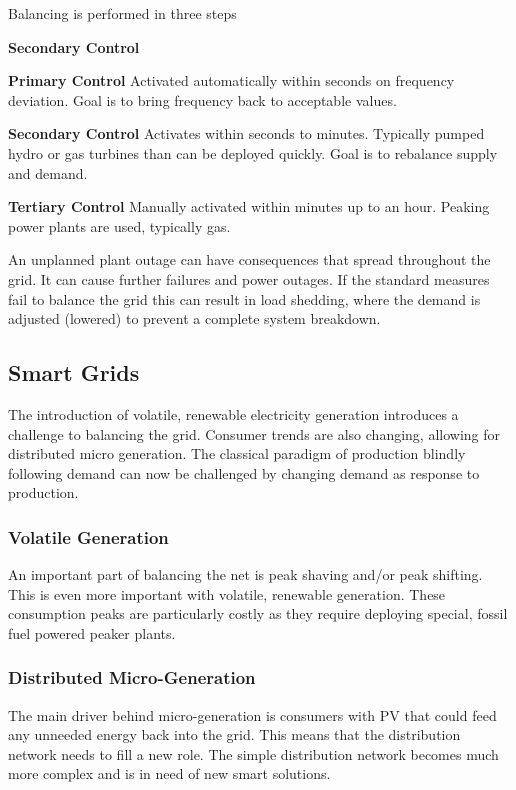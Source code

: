 Balancing is performed in three steps
\begin{labeling}{\textbf{Secondary Control}}
\item [\textbf{Primary Control}] Activated automatically within seconds on frequency deviation. Goal is to bring frequency back to acceptable values.
\item [\textbf{Secondary Control}] Activates within seconds to minutes. Typically pumped hydro or gas turbines than can be deployed quickly. Goal is to rebalance supply and demand.
\item [\textbf{Tertiary Control}] Manually activated within minutes up to an hour. Peaking power plants are used, typically gas.
\end{labeling}

An unplanned plant outage can have consequences that spread throughout the grid.
It can cause further failures and power outages.
If the standard measures fail to balance the grid this can result in load shedding, where the demand is adjusted (lowered) to prevent a complete system breakdown.

\subsection{Smart Grids}
The introduction of volatile, renewable electricity generation introduces a challenge to balancing the grid.
Consumer trends are also changing, allowing for distributed micro generation.
The classical paradigm of production blindly following demand can now be challenged by changing demand as response to production.

\subsubsection{Volatile Generation}
An important part of balancing the net is peak shaving and/or peak shifting.
This is even more important with volatile, renewable generation.
These consumption peaks are particularly costly as they require deploying special, fossil fuel powered peaker plants.

\subsubsection{Distributed Micro-Generation}
The main driver behind micro-generation is consumers with PV that could feed any unneeded energy back into the grid.
This means that the distribution network needs to fill a new role.
The simple distribution network becomes much more complex and is in need of new smart solutions.

